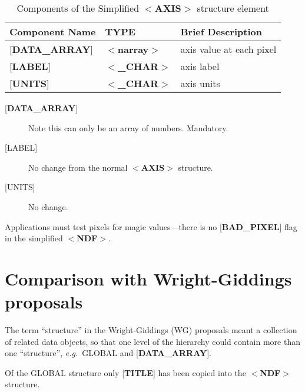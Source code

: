 \documentclass[twoside,11pt]{article}
\newcommand{\xlabel}[1]{}
\begin{document}
\begin{table}[htb]
\centering
\caption{Components of the Simplified $<${\bf AXIS}$>$ structure element}
\begin{tabular}{|l|l|l|}
\hline
Component Name & TYPE & Brief Description \\ \hline
{[}{\bf DATA\_ARRAY}{]} & $<${\bf narray}$>$ & axis value at each pixel \\
{[}{\bf LABEL}{]} & $<${\bf \_CHAR}$>$ & axis label \\
{[}{\bf UNITS}{]} & $<${\bf \_CHAR}$>$ & axis units \\ \hline
\end{tabular}
\end{table}

\begin{description}
\item [{[}{\bf DATA\_ARRAY}{]}]  Note this can only be an array of numbers. 
Mandatory.
\item [{[}LABEL{]}]  No change from the normal $<${\bf AXIS}$>$ structure.
\item [{[}UNITS{]}]  No change.
\end{description}
Applications must test pixels for magic values---there is no
{[}{\bf BAD\_PIXEL}{]} flag in the simplified $<${\bf NDF}$>$.

\xlabel{se_comparison}\section{Comparison with Wright-Giddings proposals\label{se:comparison}}

The term ``structure'' in the Wright-Giddings (WG) proposals meant
a collection of related data objects, so that one level of the hierarchy
could contain more than one ``structure'', {\it e.g.}\  GLOBAL and
{[}{\bf DATA\_ARRAY}{]}. 

Of the GLOBAL structure only {[}{\bf TITLE}{]} has been copied into the
$<${\bf NDF}$>$ structure.
\end{document}
